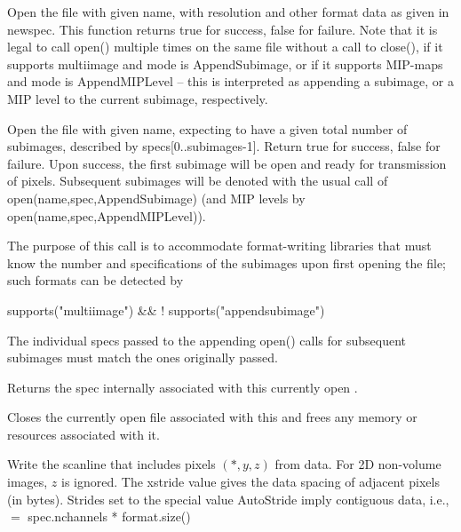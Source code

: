 Open the file with given {\kw name}, with resolution and other format
data as given in {\kw newspec}.  This function returns {\kw true} for
success, {\kw false} for failure.  Note that it is legal to call 
{\kw open()} multiple times on the same file without a call to
{\kw close()}, if it supports multiimage and {\kw mode} is 
{\kw AppendSubimage}, or if it supports MIP-maps and {\kw mode} is 
{\kw AppendMIPLevel} -- this is interpreted as appending a subimage, or
a MIP level to the current subimage, respectively.
\apiend

Open the file with given {\cf name}, expecting to have a given total
number of subimages, described by {\cf specs[0..subimages-1]}.  Return
{\cf true} for success, {\cf false} for failure.  Upon success, the
first subimage will be open and ready for transmission of
pixels.  Subsequent subimages will be denoted with the usual
call of {\cf open(name,spec,AppendSubimage)} (and MIP levels by
{\cf open(name,spec,AppendMIPLevel)}).

The purpose of this call is to accommodate format-writing libraries that
must know the number and specifications of the subimages upon first
opening the file; such formats can be detected by
\begin{code}
    supports("multiimage") && ! supports("appendsubimage")
\end{code}
The individual specs passed to the appending {\cf open()} calls for
subsequent subimages must match the ones originally passed.
\apiend


Returns the spec internally associated with this currently open
\ImageOutput.
\apiend

Closes the currently open file associated with this \ImageOutput
and frees any memory or resources associated with it.
\apiend


Write the scanline that includes pixels $(*,y,z)$ from {\cf data}.  For
2D non-volume images, $z$ is ignored.
The {\cf xstride} value gives the data spacing of adjacent pixels (in
bytes).  Strides set to the special value {\kw AutoStride} imply
contiguous data, i.e., \\ 
 $=$ {\kw spec.nchannels * format.size()} \\

